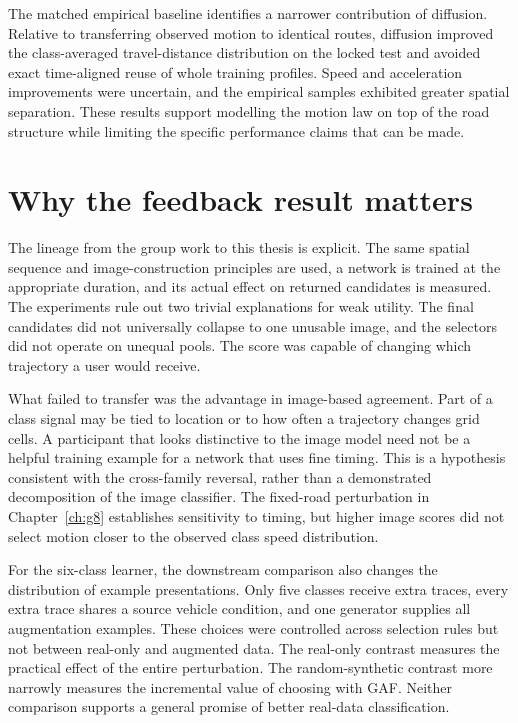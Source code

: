The matched empirical baseline identifies a narrower contribution of diffusion. Relative to transferring observed motion to identical routes, diffusion improved the class-averaged travel-distance distribution on the locked test and avoided exact time-aligned reuse of whole training profiles. Speed and acceleration improvements were uncertain, and the empirical samples exhibited greater spatial separation. These results support modelling the motion law on top of the road structure while limiting the specific performance claims that can be made.

\section{Why the feedback result matters}
The lineage from the group work to this thesis is explicit. The same spatial sequence and image-construction principles are used, a network is trained at the appropriate duration, and its actual effect on returned candidates is measured. The experiments rule out two trivial explanations for weak utility. The final candidates did not universally collapse to one unusable image, and the selectors did not operate on unequal pools. The score was capable of changing which trajectory a user would receive.

What failed to transfer was the advantage in image-based agreement. Part of a class signal may be tied to location or to how often a trajectory changes grid cells. A participant that looks distinctive to the image model need not be a helpful training example for a network that uses fine timing. This is a hypothesis consistent with the cross-family reversal, rather than a demonstrated decomposition of the image classifier. The fixed-road perturbation in Chapter~\ref{ch:g8} establishes sensitivity to timing, but higher image scores did not select motion closer to the observed class speed distribution.

For the six-class learner, the downstream comparison also changes the distribution of example presentations. Only five classes receive extra traces, every extra trace shares a source vehicle condition, and one generator supplies all augmentation examples. These choices were controlled across selection rules but not between real-only and augmented data. The real-only contrast measures the practical effect of the entire perturbation. The random-synthetic contrast more narrowly measures the incremental value of choosing with GAF. Neither comparison supports a general promise of better real-data classification.

